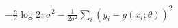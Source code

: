 \documentclass[10pt]{article}
\begin{document}
\begin{align*}-\frac{n}{2} \log{2\pi\sigma^2}-\frac{1}{2\sigma^2} \sum_i \left(y_i - g\left(x_i;\theta\right)\right)^2\end{align*}
\end{document}
